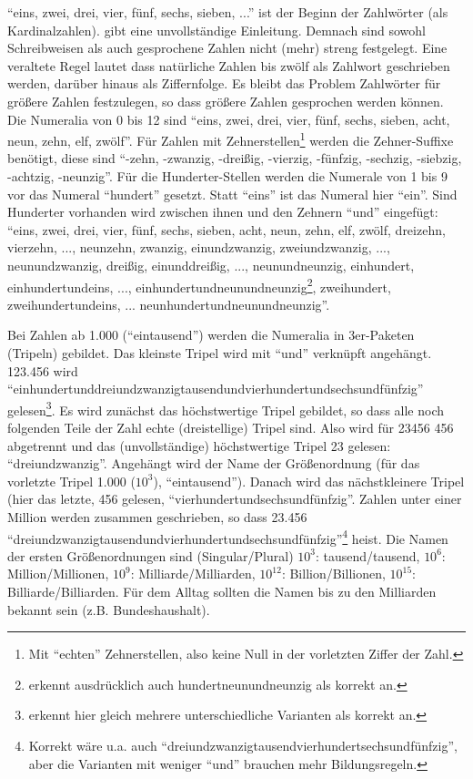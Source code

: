 \documentclass[a4paper]{book}%
\theoremstyle{definition}
\begin{document}
\enquote{eins, zwei, drei, vier, fünf, sechs, sieben, ...} ist der Beginn der Zahlwörter (als Kardinalzahlen). \citep[Randzahl 509]{DudenGrammatik2016} gibt eine unvollständige Einleitung. Demnach sind sowohl Schreibweisen als auch gesprochene Zahlen nicht (mehr) streng festgelegt. Eine veraltete Regel lautet dass natürliche Zahlen bis zwölf als Zahlwort geschrieben werden, darüber hinaus als Ziffernfolge. Es bleibt das Problem Zahlwörter für größere Zahlen festzulegen, so dass größere Zahlen gesprochen werden können. Die Numeralia von 0 bis 12 sind \enquote{eins, zwei, drei, vier, fünf, sechs, sieben, acht, neun, zehn, elf, zwölf}. Für Zahlen mit Zehnerstellen\footnote{Mit \enquote{echten} Zehnerstellen, also keine Null in der vorletzten Ziffer der Zahl.} werden die Zehner-Suffixe benötigt, diese sind \enquote{-zehn, -zwanzig, -dreißig, -vierzig, -fünfzig, -sechzig, -siebzig, -achtzig, -neunzig}. Für die Hunderter-Stellen werden die Numerale von 1 bis 9 vor das Numeral \enquote{hundert} gesetzt. Statt \enquote{eins} ist das Numeral hier \enquote{ein}. Sind Hunderter vorhanden wird zwischen ihnen und den Zehnern \enquote{und} eingefügt: \enquote{eins, zwei, drei, vier, fünf, sechs, sieben, acht, neun, zehn, elf, zwölf, dreizehn, vierzehn, ..., neunzehn, zwanzig, einundzwanzig, zweiundzwanzig, ..., neunundzwanzig, dreißig, einunddreißig, ..., neunundneunzig, einhundert, einhundertundeins, ..., einhundertundneunundneunzig\footnote{\cite{DudenGrammatik2016} erkennt ausdrücklich auch hundertneunundneunzig als korrekt an.}, zweihundert, zweihundertundeins, ... neunhundertundneunundneunzig}.

Bei Zahlen ab 1.000 (\enquote{eintausend}) werden die Numeralia in 3er-Paketen (Tripeln) gebildet. Das kleinste Tripel wird mit \enquote{und} verknüpft angehängt. 123.456 wird \enquote{einhundertunddreiundzwanzigtausendundvierhundertundsechsundfünfzig} gelesen\footnote{\citep{DudenGrammatik2016} erkennt hier gleich mehrere unterschiedliche Varianten als korrekt an.}. Es wird zunächst das höchstwertige Tripel gebildet, so dass alle noch folgenden Teile der Zahl echte (dreistellige) Tripel sind. Also wird für 23456 456 abgetrennt und das (unvollständige) höchstwertige Tripel 23 gelesen: \enquote{dreiundzwanzig}. Angehängt wird der Name der Größenordnung (für das vorletzte Tripel 1.000 ($10^3$), \enquote{eintausend}). Danach wird das nächstkleinere Tripel (hier das letzte, 456 gelesen, \enquote{vierhundertundsechsundfünfzig}. Zahlen unter einer Million werden zusammen geschrieben, so dass 23.456 \enquote{dreiundzwanzigtausendundvierhundertundsechsundfünfzig}\footnote{Korrekt wäre u.a. auch \enquote{dreiundzwanzigtausendvierhundertsechsundfünfzig}, aber die Varianten mit weniger \enquote{und} brauchen mehr Bildungsregeln.} heist. Die Namen der ersten Größenordnungen sind (Singular/Plural) $10^3$: tausend/tausend, $10^6$: Million/Millionen, $10^9$: Milliarde/Milliarden, $10^{12}$: Billion/Billionen, $10^{15}$: Billiarde/Billiarden. Für dem Alltag sollten die Namen bis zu den Milliarden bekannt sein (z.B. Bundeshaushalt).
\end{document}
